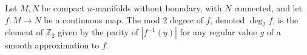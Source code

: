 Let $M, N$ be compact $n$-manifolds without boundary, with $N$ connected, and let $f: M \to N$ be a continuous map. The mod 2 degree of $f$, denoted $\deg_2 f$, is the element of $\mathbb{Z}_2$ given by the parity of $|f^{-1}(y)|$ for any regular value $y$ of a smooth approximation to $f$.
